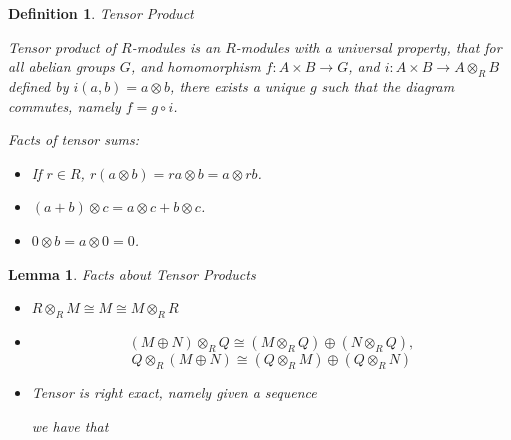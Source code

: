 \documentclass[12pt]{Qual}
\newtheorem{definition}{Definition}
\newtheorem{lemma}{Lemma}
\begin{document}
\begin{definition}{\Large\textit{Tensor Product}}
$\,$

Tensor product of $R$-modules is an $R$-modules with a universal property, that for all abelian groups $G$, and homomorphism $f:A\times B\to G$, and $i:A\times B\to A\otimes_R B$ defined by $i(a,b)=a\otimes b$, there exists a unique $g$ such that the diagram commutes, namely $f=g\circ i$.

\begin{center}
\end{center}

Facts of tensor sums:

\begin{itemize}
\renewcommand\labelitemi{\faCoffee}
    \item If $r\in R$, $r(a\otimes b)=ra\otimes b=a\otimes rb$.
    \item $(a+b)\otimes c=a\otimes c+b\otimes c$.
    \item $0\otimes b=a\otimes 0=0$.
\end{itemize}


\end{definition}
\vspace{0.5cm}
\begin{lemma}{\Large\textit{Facts about Tensor Products}}

\begin{itemize}
\renewcommand\labelitemi{\faCoffee}
    \item $R\otimes_R M\cong M\cong M\otimes_R R$
    \item $$(M\oplus N)\otimes_R Q\cong (M\otimes_R Q)\oplus (N\otimes_R Q),$$ $$Q \otimes_R (M\oplus N)\cong (Q\otimes_R M)\oplus (Q\otimes_R N)$$
    \item Tensor is right exact, namely given a sequence


    we have that

\end{itemize}

\end{lemma}
\vspace{0.5cm}
\end{document}

